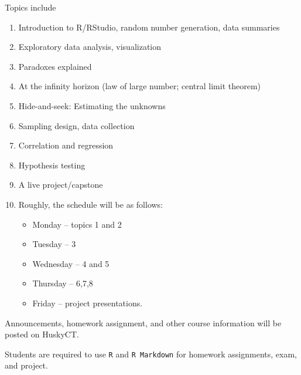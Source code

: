 \documentclass[twocolumn,hidelinks]{article}
\begin{document}
\begin{description}
Topics include
\begin{enumerate}[noitemsep]
\item
  Introduction to R/RStudio, random number generation, data summaries
\item
  Exploratory data analysis, visualization
\item
  Paradoxes explained
\item
  At the infinity horizon (law of large number; central limit theorem)
\item
  Hide-and-seek: Estimating the unknowns
\item
  Sampling design, data collection
\item
  Correlation and regression
\item
  Hypothesis testing
\item
  A live project/capstone\\[-3mm]
\item [] \hspace{-0.91cm} Roughly, the schedule will be as follows:
 \begin{itemize}\setlength\itemsep{0em}
\item Monday -- topics 1 and 2
\item Tuesday -- 3
\item Wednesday -- 4 and 5
\item Thursday -- 6,7,8
\item Friday -- project presentations.
\end{itemize}

\end{enumerate}

Announcements, homework assignment, and other course
information will be posted on HuskyCT.

\item[Computing:]
  Students are required to use \texttt{R} and \texttt{R Markdown}
  for homework assignments, exam, and project.


\end{description}
\end{document}
